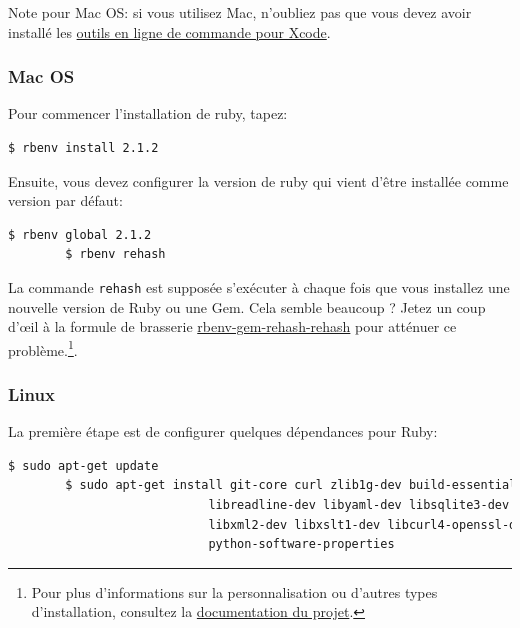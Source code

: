 \documentclass[]{report}
\begin{document}
      Note pour Mac OS: si vous utilisez Mac, n'oubliez pas que vous devez avoir installé les \href{https://developer.apple.com/downloads/}{outils en ligne de commande pour Xcode}.


      \subsubsection{Mac OS}

        Pour commencer l'installation de ruby, tapez:

        \begin{scriptsize}
        \begin{lstlisting}[language=bash]
        $ rbenv install 2.1.2
        \end{lstlisting}
        \end{scriptsize}

        Ensuite, vous devez configurer la version de ruby qui vient d'être installée comme version par défaut:

        \begin{scriptsize}
        \begin{lstlisting}[language=bash]
        $ rbenv global 2.1.2
        $ rbenv rehash
        \end{lstlisting}
        \end{scriptsize}

        La commande \verb|rehash| est supposée s'exécuter à chaque fois que vous installez une nouvelle version de Ruby ou une Gem. Cela semble beaucoup ? Jetez un coup d'œil à la formule de brasserie \href{https://github.com/sstephenson/rbenv-gem-rehash}{rbenv-gem-rehash-rehash} pour atténuer ce problème.\footnote{Pour plus d'informations sur la personnalisation ou d'autres types d'installation, consultez la \href{https://github.com/sstephenson/rbenv}{documentation du projet}.}.

      \subsubsection{Linux}

        La première étape est de configurer quelques dépendances pour Ruby:

        \begin{scriptsize}
        \begin{lstlisting}[language=bash]
        $ sudo apt-get update
        $ sudo apt-get install git-core curl zlib1g-dev build-essential libssl-dev \
                            libreadline-dev libyaml-dev libsqlite3-dev sqlite3 \
                            libxml2-dev libxslt1-dev libcurl4-openssl-dev zlib1g-dev \
                            python-software-properties
        \end{lstlisting}
        \end{scriptsize}
\end{document}
